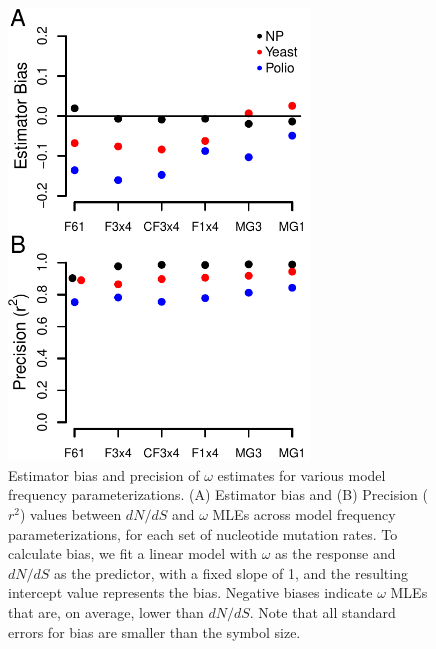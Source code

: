 \documentclass[11pt]{article}
\begin{document}
\begin{figure}[htbp]
	\centerline{\includegraphics[width=8cm]{figures/MainText/nyp_bias_r2.pdf}}
	\caption{\label{nyp_bias_r2} Estimator bias and precision of $\omega$ estimates for various model frequency parameterizations. (A) Estimator bias and (B) Precision ($r^2$) values between $dN/dS$ and $\omega$ MLEs across model frequency parameterizations, for each set of nucleotide mutation rates. To calculate bias, we fit a linear model with $\omega$ as the response and $dN/dS$ as the predictor, with a fixed slope of 1, and the resulting intercept value represents the bias. Negative biases indicate $\omega$ MLEs that are, on average, lower than $dN/dS$. Note that all standard errors for bias are smaller than the symbol size.}	
\end{figure}

\vspace{2cm}
\end{document}

